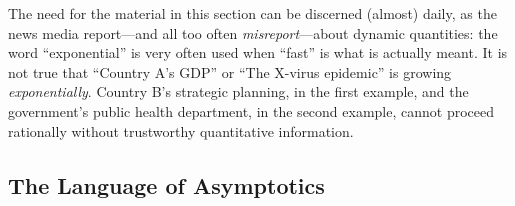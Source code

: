 The need for the material in this section can be discerned (almost)
daily, as the news media report---and all too often {\em
  misreport}---about dynamic quantities: the word ``exponential'' is
very often used when ``fast'' is what is actually meant.  It is not
true that ``Country A's GDP'' or ``The X-virus epidemic'' is growing
{\em exponentially}.  Country B's strategic planning, in the first
example, and the government's public health department, in the second
example, cannot proceed rationally without trustworthy quantitative
information.


\subsection{The Language of Asymptotics}
\label{sec:language-asymptotics}

